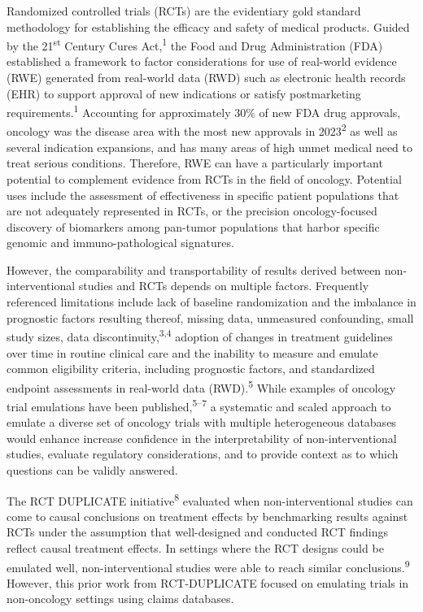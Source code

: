 \documentclass[
  letterpaper,
  DIV=11,
  numbers=noendperiod]{scrartcl}
\begin{document}
Randomized controlled trials (RCTs) are the evidentiary gold standard
methodology for establishing the efficacy and safety of medical
products. Guided by the 21\textsuperscript{st} Century Cures
Act,\textsuperscript{1} the Food and Drug Administration (FDA)
established a framework to factor considerations for use of real-world
evidence (RWE) generated from real-world data (RWD) such as electronic
health records (EHR) to support approval of new indications or satisfy
postmarketing requirements.\textsuperscript{1} Accounting for
approximately 30\% of new FDA drug approvals, oncology was the disease
area with the most new approvals in 2023\textsuperscript{2} as well as
several indication expansions, and has many areas of high unmet medical
need to treat serious conditions. Therefore, RWE can have a particularly
important potential to complement evidence from RCTs in the field of
oncology. Potential uses include the assessment of effectiveness in
specific patient populations that are not adequately represented in
RCTs, or the precision oncology-focused discovery of biomarkers among
pan-tumor populations that harbor specific genomic and
immuno-pathological signatures.

However, the comparability and transportability of results derived
between non-interventional studies and RCTs depends on multiple factors.
Frequently referenced limitations include lack of baseline randomization
and the imbalance in prognostic factors resulting thereof, missing data,
unmeasured confounding, small study sizes, data
discontinuity,\textsuperscript{3,4} adoption of changes in treatment
guidelines over time in routine clinical care and the inability to
measure and emulate common eligibility criteria, including prognostic
factors, and standardized endpoint assessments in real-world data
(RWD).\textsuperscript{5} While examples of oncology trial emulations
have been published,\textsuperscript{5--7} a systematic and scaled
approach to emulate a diverse set of oncology trials with multiple
heterogeneous databases would enhance increase confidence in the
interpretability of non-interventional studies, evaluate regulatory
considerations, and to provide context as to which questions can be
validly answered.

The RCT DUPLICATE initiative\textsuperscript{8} evaluated when
non-interventional studies can come to causal conclusions on treatment
effects by benchmarking results against RCTs under the assumption that
well-designed and conducted RCT findings reflect causal treatment
effects. In settings where the RCT designs could be emulated well,
non-interventional studies were able to reach similar
conclusions.\textsuperscript{9} However, this prior work from
RCT-DUPLICATE focused on emulating trials in non-oncology settings using
claims databases.
\end{document}
